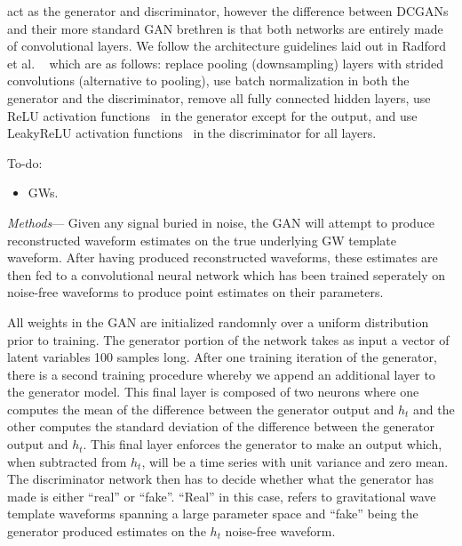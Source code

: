 \documentclass[%
showpacs,
 amsmath,amssymb,
 aps,
 twocolumn,
 prl,
 reprint,
floatfix,
]{revtex4-1}
\begin{document}
act as the generator and discriminator, however the difference between DCGANs
and their more standard GAN brethren is that both networks are entirely made of
convolutional layers. We follow the architecture guidelines laid out in Radford
et al. ~\cite{1511.06434} which are as follows: replace pooling (downsampling)
layers with strided convolutions (alternative to pooling), use batch
normalization in both the generator and the discriminator, remove all fully
connected hidden layers, use ReLU activation
functions~\cite{Nair:2010:RLU:3104322.3104425} in the generator except for the
output, and use LeakyReLU activation functions~\cite{Maas2013RectifierNI} in
the discriminator for all layers.

To-do:

\begin{itemize}
\item GWs.
\end{itemize}

\textit{Methods}---
%
%
Given any signal buried in noise, the \ac{GAN} will attempt to produce
reconstructed waveform estimates on the true underlying GW template waveform.
After having produced reconstructed waveforms, these estimates are then fed to
a convolutional neural network which has been trained seperately on noise-free
waveforms to produce point estimates on their parameters. 

%
All weights in the GAN are initialized randomnly over a uniform distribution
prior to training. The generator portion of the network takes as input a vector
of latent variables 100 samples long. After one training iteration of the
generator, there is a second training procedure whereby we append an additional
layer to the generator model. This final layer is composed of two neurons where
one computes the mean of the difference between the generator output and $h_t$
and the other computes the standard deviation of the difference between the
generator output and $h_t$. This final layer enforces the generator to make an
output which, when subtracted from $h_t$, will be a time series with unit
variance and zero mean. The discriminator network then has to decide whether
what the generator has made is either ``real'' or ``fake''. ``Real'' in this
case, refers to gravitational wave template waveforms spanning a large
parameter space and ``fake'' being the generator produced estimates on the
$h_t$ noise-free waveform. 
\end{document}
